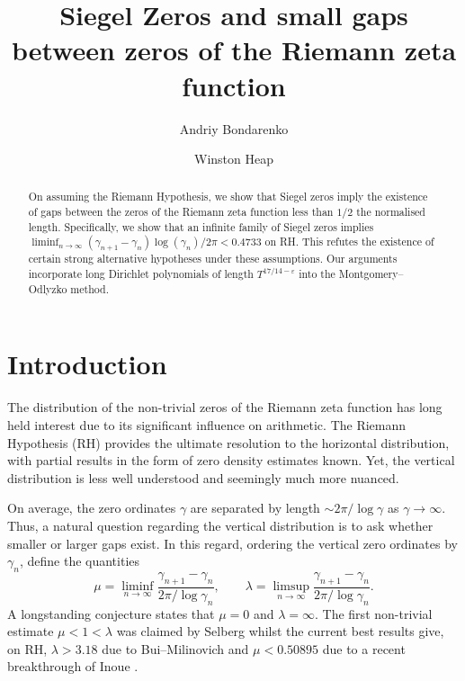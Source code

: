 \documentclass[12pt, oneside]{amsart}
\theoremstyle{definition}
\newcommand{\eps}{\varepsilon}
\newcommand{\1}{\mathds{1}}
\begin{document}
\title[Siegel Zeros and small gaps]{Siegel Zeros and small gaps between zeros of the Riemann zeta function}
\author[A. Bondarenko]{Andriy Bondarenko}
\address{Department of Mathematical Sciences, Norwegian University of Science and Technology (NTNU), 7491 Trondheim, Norway.}

\author[W. Heap]{Winston Heap}

\begin{abstract}
On assuming the Riemann Hypothesis, we show that Siegel zeros imply the existence of gaps between the zeros of the Riemann zeta function less than $1/2$ the normalised length. Specifically, we show that an infinite family of Siegel zeros implies $\liminf_{n\to\infty}(\gamma_{n+1}-\gamma_n)\log(\gamma_n)/2\pi< 0.4733$ on RH. This refutes the existence of certain strong alternative hypotheses under these assumptions. Our arguments incorporate long Dirichlet polynomials of length $T^{17/14-\eps}$ into the Montgomery--Odlyzko method. 
\end{abstract}

\maketitle


\section{Introduction}

The distribution of the non-trivial zeros of the Riemann zeta function has long held interest due to its significant influence on arithmetic. The Riemann Hypothesis (RH) provides the ultimate resolution to the horizontal distribution, with partial results in the form of zero density estimates known. Yet, the vertical distribution is less well understood and seemingly much more nuanced. 

On average, the zero ordinates $\gamma$ are separated by length $\sim 2\pi/\log \gamma$ as $\gamma\to\infty$. Thus, a natural question regarding the vertical distribution is to ask whether smaller or larger gaps exist. In this regard, ordering the vertical zero ordinates by $\gamma_n$, define the quantities 
\[
\mu=\liminf_{n\to\infty}\frac{\gamma_{n+1}-\gamma_n}{2\pi/\log \gamma_n},
\qquad
\lambda=\limsup_{n\to\infty}\frac{\gamma_{n+1}-\gamma_n}{2\pi/\log \gamma_n}.
\] 
A longstanding conjecture states that $\mu=0$ and $\lambda=\infty$. The first non-trivial estimate $\mu<1<\lambda$ was claimed by Selberg whilst the current best results give, on RH, $\lambda>3.18$ due to Bui--Milinovich \cite{BM} and $\mu<0.50895$  due to a recent breakthrough of Inoue \cite{Inoue}. 
\end{document}
